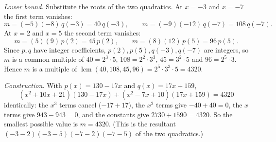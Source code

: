 \emph{Lower bound.} Substitute the roots of the two quadratics. At $x=-3$ and $x=-7$ the first term vanishes:
\[
m=(-5)(-8)\,q(-3)=40\,q(-3),\qquad m=(-9)(-12)\,q(-7)=108\,q(-7).
\]
At $x=2$ and $x=5$ the second term vanishes:
\[
m=(5)(9)\,p(2)=45\,p(2),\qquad m=(8)(12)\,p(5)=96\,p(5).
\]
Since $p,q$ have integer coefficients, $p(2),p(5),q(-3),q(-7)$ are integers, so $m$ is a common multiple of $40=2^3\cdot5$, $108=2^2\cdot3^3$, $45=3^2\cdot5$ and $96=2^5\cdot3$. Hence $m$ is a multiple of $\operatorname{lcm}(40,108,45,96)=2^5\cdot3^3\cdot5=4320$.

\emph{Construction.} With $p(x)=130-17x$ and $q(x)=17x+159$,
\[
(x^2+10x+21)(130-17x)+(x^2-7x+10)(17x+159)=4320
\]
identically: the $x^3$ terms cancel ($-17+17$), the $x^2$ terms give $-40+40=0$, the $x$ terms give $943-943=0$, and the constants give $2730+1590=4320$. So the smallest possible value is $m=\boxed{4320}$. (This is the resultant $(-3-2)(-3-5)(-7-2)(-7-5)$ of the two quadratics.)
